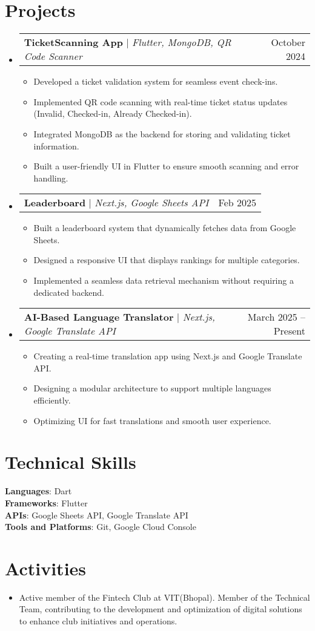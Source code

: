 \documentclass[letterpaper,11pt]{article}
\makeatletter
\newcommand{\resumeItem}[1]{
  \item\small{
    {#1 \vspace{-2pt}}
  }
}
\newcommand{\resumeProjectHeading}[2]{
    \item
    \begin{tabular*}{0.97\textwidth}{l@{\extracolsep{\fill}}r}
      \small#1 & #2 \\
    \end{tabular*}\vspace{-7pt}
}
\newcommand{\resumeSubHeadingListStart}{\begin{itemize}[leftmargin=0.15in, label={}]}
\newcommand{\resumeSubHeadingListEnd}{\end{itemize}}
\newcommand{\resumeItemListStart}{\begin{itemize}}
\newcommand{\resumeItemListEnd}{\end{itemize}\vspace{-5pt}}
\makeatother
\begin{document}
\section{Projects}
    \resumeSubHeadingListStart
      \resumeProjectHeading
          {\textbf{TicketScanning App} $|$ \emph{Flutter, MongoDB, QR Code Scanner}}{October 2024}
          \resumeItemListStart
            \resumeItem{Developed a ticket validation system for seamless event check-ins.}
            \resumeItem{Implemented QR code scanning with real-time ticket status updates (Invalid, Checked-in, Already Checked-in).}
            \resumeItem{Integrated MongoDB as the backend for storing and validating ticket information.}
            \resumeItem{Built a user-friendly UI in Flutter to ensure smooth scanning and error handling.}
          \resumeItemListEnd
      \resumeProjectHeading
          {\textbf{Leaderboard} $|$ \emph{Next.js, Google Sheets API}}{Feb 2025}
          \resumeItemListStart
            \resumeItem{Built a leaderboard system that dynamically fetches data from Google Sheets.}
            \resumeItem{Designed a responsive UI that displays rankings for multiple categories.}
            \resumeItem{Implemented a seamless data retrieval mechanism without requiring a dedicated backend.}
          \resumeItemListEnd
      \resumeProjectHeading
          {\textbf{AI-Based Language Translator} $|$ \emph{Next.js, Google Translate API}}{March 2025 -- Present}
          \resumeItemListStart
            \resumeItem{Creating a real-time translation app using Next.js and Google Translate API.}
            \resumeItem{Designing a modular architecture to support multiple languages efficiently.}
            \resumeItem{Optimizing UI for fast translations and smooth user experience.}
          \resumeItemListEnd
    \resumeSubHeadingListEnd

\section{Technical Skills}
 \begin{itemize}[leftmargin=0.15in, label={}]
    \small{\item{
     \textbf{Languages}{: Dart} \\
     \textbf{Frameworks}{: Flutter} \\
     \textbf{APIs}{: Google Sheets API, Google Translate API} \\
     \textbf{Tools and Platforms}{: Git, Google Cloud Console}
    }}
 \end{itemize}

\section{Activities}
    \resumeItemListStart
        \resumeItem{Active member of the Fintech Club at VIT(Bhopal). Member of the Technical Team, contributing to the development and optimization of digital solutions to enhance club initiatives and operations.}
    \resumeItemListEnd
\end{document}
